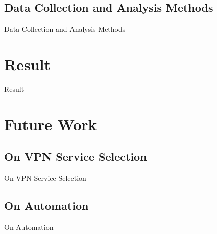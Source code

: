 \documentclass{beamer}
\begin{document}
\subsection{Data Collection and Analysis Methods}

\begin{frame}{Data Collection and Analysis Methods}
\end{frame}

\section{Result}

\begin{frame}{Result}
\end{frame}

\section{Future Work}

\subsection{On VPN Service Selection}

\begin{frame}{On VPN Service Selection}
\end{frame}

\subsection{On Automation}

\begin{frame}{On Automation}
\end{frame}
\end{document}
